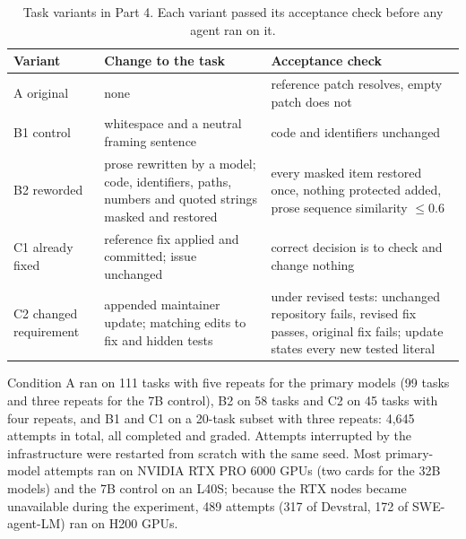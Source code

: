 \documentclass[conference]{IEEEtran}
\begin{document}
\begin{table}[t]
\centering
\caption{Task variants in Part 4. Each variant passed its acceptance check before any agent ran on it.}
\label{tab:variants}
\footnotesize
\setlength{\tabcolsep}{3pt}
\begin{tabular}{L{1.25cm}L{3.0cm}L{3.6cm}}
\toprule
Variant & Change to the task & Acceptance check\\
\midrule
A original & none & reference patch resolves, empty patch does not\\
B1 control & whitespace and a neutral framing sentence & code and identifiers unchanged\\
B2 reworded & prose rewritten by a model; code, identifiers, paths, numbers and quoted strings masked and restored & every masked item restored once, nothing protected added, prose sequence similarity $\le 0.6$\\
C1 already fixed & reference fix applied and committed; issue unchanged & correct decision is to check and change nothing\\
C2 changed requirement & appended maintainer update; matching edits to fix and hidden tests & under revised tests: unchanged repository fails, revised fix passes, original fix fails; update states every new tested literal\\
\bottomrule
\end{tabular}
\end{table}

Condition A ran on 111 tasks with five repeats for the primary models (99 tasks and three repeats for the 7B control), B2 on 58 tasks and C2 on 45 tasks with four repeats, and B1 and C1 on a 20-task subset with three repeats: 4{,}645 attempts in total, all completed and graded. Attempts interrupted by the infrastructure were restarted from scratch with the same seed. Most primary-model attempts ran on NVIDIA RTX PRO 6000 GPUs (two cards for the 32B models) and the 7B control on an L40S; because the RTX nodes became unavailable during the experiment, 489 attempts (317 of Devstral, 172 of SWE-agent-LM) ran on H200 GPUs.
\end{document}
